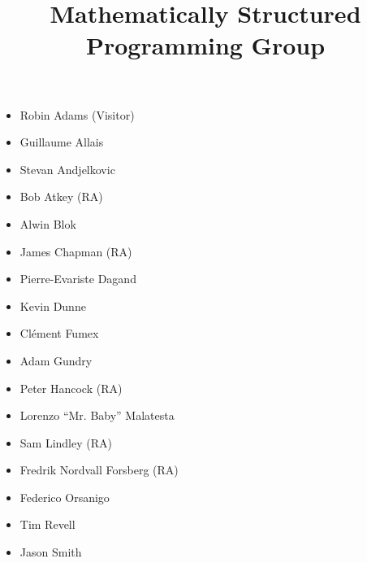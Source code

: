 \documentclass{article}
\begin{document}
\title{\Huge \textbf{Mathematically Structured Programming Group}}

\date{}
\maketitle
\thispagestyle{empty} %

\begin{center}

%

\vskip -0.5cm
\large
\begin{itemize}
  \addtolength{\leftskip}{2cm}
  \item Robin Adams (Visitor)
  \item Guillaume Allais
  \item Stevan Andjelkovic
  \item Bob Atkey (RA)
  \item Alwin Blok
  \item James Chapman (RA)
  \item Pierre-Evariste Dagand
  \item Kevin Dunne
  \item Cl\'{e}ment Fumex
  \item Adam Gundry
  \item Peter Hancock (RA)
  \item Lorenzo ``Mr. Baby'' Malatesta
  \item Sam Lindley (RA)
  \item Fredrik Nordvall Forsberg (RA)
  \item Federico Orsanigo
  \item Tim Revell
  \item Jason Smith
\end{itemize}
\vskip 1cm

\end{center}
\end{document}
